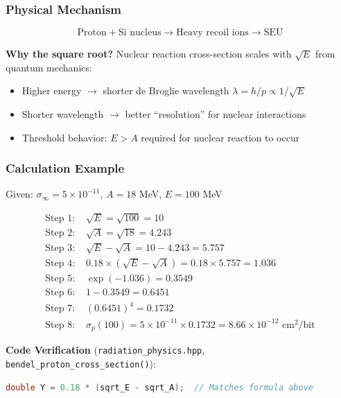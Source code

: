 \documentclass[11pt,a4paper]{article}
\begin{document}
\subsubsection{Physical Mechanism}

\begin{equation}
\text{Proton} + \text{Si nucleus} \to \text{Heavy recoil ions} \to \text{SEU}
\end{equation}

\textbf{Why the square root?} Nuclear reaction cross-section scales with $\sqrt{E}$ from quantum mechanics:
\begin{itemize}
    \item Higher energy $\to$ shorter de Broglie wavelength $\lambda = h/p \propto 1/\sqrt{E}$
    \item Shorter wavelength $\to$ better ``resolution'' for nuclear interactions
    \item Threshold behavior: $E > A$ required for nuclear reaction to occur
\end{itemize}

\subsubsection{Calculation Example}

Given: $\sigma_\infty = 5 \times 10^{-11}$, $A = 18$ MeV, $E = 100$ MeV

\begin{align}
\text{Step 1: } & \sqrt{E} = \sqrt{100} = 10 \\
\text{Step 2: } & \sqrt{A} = \sqrt{18} = 4.243 \\
\text{Step 3: } & \sqrt{E} - \sqrt{A} = 10 - 4.243 = 5.757 \\
\text{Step 4: } & 0.18 \times (\sqrt{E} - \sqrt{A}) = 0.18 \times 5.757 = 1.036 \\
\text{Step 5: } & \exp(-1.036) = 0.3549 \\
\text{Step 6: } & 1 - 0.3549 = 0.6451 \\
\text{Step 7: } & (0.6451)^4 = 0.1732 \\
\text{Step 8: } & \sigma_p(100) = 5 \times 10^{-11} \times 0.1732 = 8.66 \times 10^{-12} \text{ cm}^2/\text{bit}
\end{align}

\textbf{Code Verification} (\texttt{radiation\_physics.hpp}, \texttt{bendel\_proton\_cross\_section()}):
\begin{lstlisting}[language=C++, basicstyle=\small\ttfamily]
double Y = 0.18 * (sqrt_E - sqrt_A);  // Matches formula above
\end{lstlisting}
\end{document}
